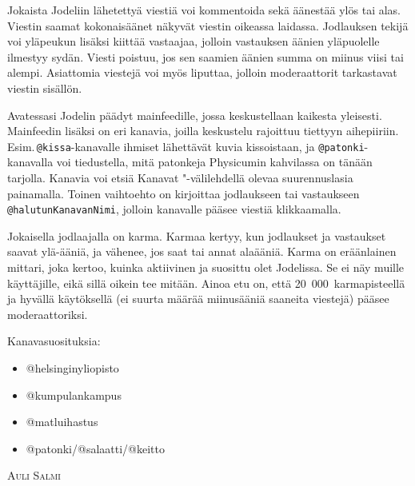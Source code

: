 \documentclass[a5paper, 8pt, twocolumn]{book} %
\numberwithin{equation}{section}
\begin{document}
Jokaista Jodeliin lähetettyä viestiä voi kommentoida sekä äänestää ylös tai alas. Viestin saamat kokonais\-äänet näkyvät viestin oikeassa laidassa. Jodlauksen tekijä voi yläpeukun lisäksi kiittää vastaajaa, jolloin vastauksen äänien yläpuolelle ilmestyy sydän. Viesti poistuu, jos sen saamien äänien summa on miinus viisi tai alempi. Asiattomia viestejä voi myös liputtaa, jolloin moderaattorit tarkastavat viestin sisällön.

Avatessasi Jodelin päädyt mainfeedille, jossa keskustellaan kaikesta yleisesti. Mainfeedin lisäksi on eri kanavia, joilla keskustelu rajoittuu tiettyyn aihepiiriin. Esim.\,\texttt{@kissa}-kanavalle ihmiset lähettävät kuvia kissoistaan, ja \texttt{@patonki}-kanavalla voi tiedustella, mitä patonkeja Physicumin kahvilassa on tänään tarjolla. Kanavia voi etsiä Kanavat "-välilehdellä olevaa suurennuslasia painamalla. Toinen vaihtoehto on kirjoittaa jodlaukseen tai vastaukseen \texttt{@halutunKanavanNimi}, jolloin kanavalle pääsee viestiä klikkaamalla.  

Jokaisella jodlaajalla on karma. Karmaa kertyy, kun jodlaukset ja vastaukset saavat ylä-ääniä, ja vähenee, jos saat tai annat alaääniä. Karma on erään\-lainen mittari, joka kertoo, kuinka aktiivinen ja suosittu olet Jodelissa. Se ei näy muille käyttäjille, eikä sillä oikein tee mitään. Ainoa etu on, että 20~000~karma\-pisteellä ja hyvällä käytöksellä (ei suurta määrää miinus\-ääniä saaneita viestejä) pääsee moderaattoriksi.

Kanavasuosituksia:
\begin{itemize}
	\item @helsinginyliopisto
	\item @kumpulankampus
	\item @matluihastus
	\item @patonki/@salaatti/@keitto
\end{itemize}

\vspace{0.5cm}
\noindent\textsc{Auli Salmi}
\end{document}

